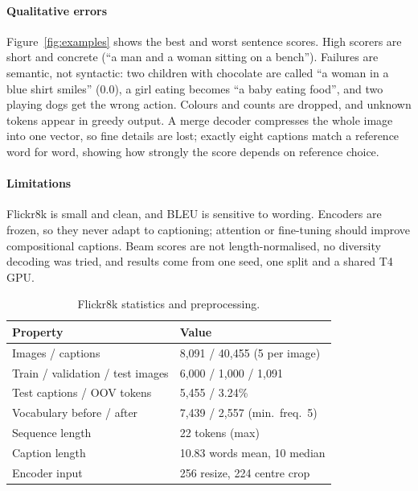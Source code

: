 \documentclass[10pt,journal,a4paper]{IEEEtran}
\begin{document}
\paragraph{Qualitative errors}
Figure~\ref{fig:examples} shows the best and worst sentence scores. High scorers
are short and concrete (``a man and a woman sitting on a bench''). Failures are
semantic, not syntactic: two children with chocolate are called ``a woman in a
blue shirt smiles'' (0.0), a girl eating becomes ``a baby eating food'', and two
playing dogs get the wrong action. Colours and counts are dropped, and unknown
tokens appear in greedy output. A merge decoder compresses the whole image into
one vector, so fine details are lost; exactly eight captions match a reference
word for word, showing how strongly the score depends on reference choice.

\paragraph{Limitations}
Flickr8k is small and clean, and BLEU is sensitive to wording. Encoders are
frozen, so they never adapt to captioning; attention or fine-tuning should
improve compositional captions. Beam scores are not length-normalised, no
diversity decoding was tried, and results come from one seed, one split and a
shared T4 GPU.

\begin{table}[t]
\centering
\caption{Flickr8k statistics and preprocessing.}
\label{tab:data}
\footnotesize
\setlength{\tabcolsep}{3pt}
\begin{tabular}{@{}ll@{}}
\toprule
Property & Value \\
\midrule
Images / captions & 8,091 / 40,455 (5 per image) \\
Train / validation / test images & 6,000 / 1,000 / 1,091 \\
Test captions / OOV tokens & 5,455 / 3.24\% \\
Vocabulary before / after & 7,439 / 2,557 (min.\ freq.\ 5) \\
Sequence length & 22 tokens (max) \\
Caption length & 10.83 words mean, 10 median \\
Encoder input & 256 resize, 224 centre crop \\
\bottomrule
\end{tabular}
\end{table}
\end{document}
